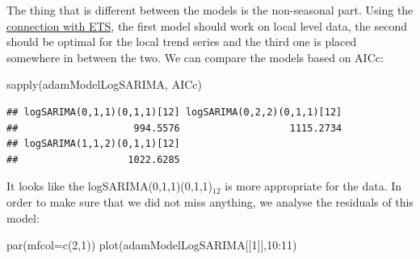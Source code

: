 \documentclass[
]{book}
\newenvironment{Shaded}{\begin{snugshade}}{\end{snugshade}}
\newcommand{\AttributeTok}[1]{\textcolor[rgb]{0.77,0.63,0.00}{#1}}
\newcommand{\DecValTok}[1]{\textcolor[rgb]{0.00,0.00,0.81}{#1}}
\newcommand{\FunctionTok}[1]{\textcolor[rgb]{0.00,0.00,0.00}{#1}}
\newcommand{\NormalTok}[1]{#1}
\newcommand{\SpecialCharTok}[1]{\textcolor[rgb]{0.00,0.00,0.00}{#1}}
\theoremstyle{definition}
\theoremstyle{definition}
\theoremstyle{definition}
\theoremstyle{definition}
\theoremstyle{remark}
\begin{document}
The thing that is different between the models is the non-seasonal part. Using the \protect\hyperlink{ARIMAandETS}{connection with ETS}, the first model should work on local level data, the second should be optimal for the local trend series and the third one is placed somewhere in between the two. We can compare the models based on AICc:

\begin{Shaded}
\begin{Highlighting}[]
\FunctionTok{sapply}\NormalTok{(adamModelLogSARIMA, AICc)}
\end{Highlighting}
\end{Shaded}

\begin{verbatim}
## logSARIMA(0,1,1)(0,1,1)[12] logSARIMA(0,2,2)(0,1,1)[12] 
##                    994.5576                   1115.2734 
## logSARIMA(1,1,2)(0,1,1)[12] 
##                   1022.6285
\end{verbatim}

It looks like the logSARIMA(0,1,1)(0,1,1)\(_{12}\) is more appropriate for the data. In order to make sure that we did not miss anything, we analyse the residuals of this model:

\begin{Shaded}
\begin{Highlighting}[]
\FunctionTok{par}\NormalTok{(}\AttributeTok{mfcol=}\FunctionTok{c}\NormalTok{(}\DecValTok{2}\NormalTok{,}\DecValTok{1}\NormalTok{))}
\FunctionTok{plot}\NormalTok{(adamModelLogSARIMA[[}\DecValTok{1}\NormalTok{]],}\DecValTok{10}\SpecialCharTok{:}\DecValTok{11}\NormalTok{)}
\end{Highlighting}
\end{Shaded}
\end{document}

